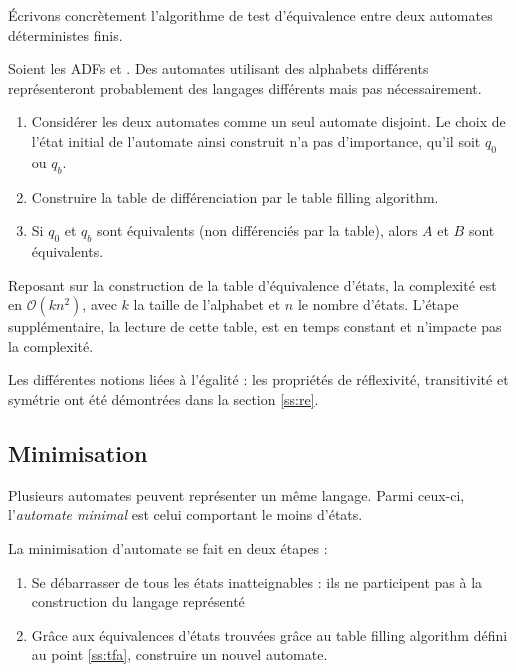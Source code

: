 Écrivons concrètement l'algorithme de test d'équivalence entre deux automates déterministes finis.
\begin{algo}\label{alg:eqauto}
  Soient les ADFs \automaton et \automatonbis. Des automates utilisant des alphabets différents représenteront probablement des langages différents mais pas nécessairement.
  \begin{enumerate}
    \item Considérer les deux automates comme un seul automate disjoint. Le choix de l'état initial de l'automate ainsi construit n'a pas d'importance, qu'il soit $q_0$ ou $q_b$.
    \item Construire la table de différenciation par le table filling algorithm.
    \item Si $q_0$ et $q_b$ sont équivalents (non différenciés par la table), alors $A$ et $B$ sont équivalents.
  \end{enumerate}

\end{algo}



\begin{complexity}
 Reposant sur la construction de la table d'équivalence d'états, la complexité est en $\mathcal{O}(kn^2)$, avec $k$ la taille de l'alphabet et $n$ le nombre d'états. L'étape supplémentaire, la lecture de cette table, est en temps constant et n'impacte pas la complexité.
\end{complexity}


Les différentes notions liées à l'égalité : les propriétés de réflexivité, transitivité et symétrie ont été démontrées dans la section \ref{ss:re}.



\subsection{Minimisation}\label{ss:mini}

Plusieurs automates peuvent représenter un même langage. Parmi ceux-ci, l'\emph{automate minimal} est celui comportant le moins d'états.


La minimisation d'automate se fait en deux étapes :
\begin{enumerate}
 \item Se débarrasser de tous les états inatteignables : ils ne participent pas à la construction du langage représenté
 \item Grâce aux équivalences d'états trouvées grâce au table filling algorithm défini au point \ref{ss:tfa}, construire un nouvel automate.
\end{enumerate}

